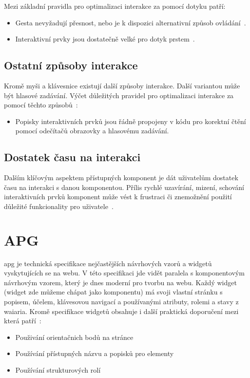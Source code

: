 Mezi základní pravidla pro optimalizaci interakce za pomocí dotyku patří:

\begin{itemize}
  \item Gesta nevyžadují přesnost, nebo je k dispozici alternativní způsob ovládání~\cite{wcag-pointer-gestures}.
  \item Interaktivní prvky jsou dostatečně velké pro dotyk prstem~\cite{wcag-target-size}.
\end{itemize}

\subsection{Ostatní způsoby interakce}


Kromě myši a klávesnice existují další způsoby interakce.
Další variantou může být hlasové zadávání.
Výčet důležitých pravidel pro optimalizaci interakce za pomocí těchto způsobů~\cite{w3-accessibility-principles}:

\begin{itemize}
  \item Popisky interaktivních prvků jsou řádně propojeny v kódu pro korektní čtění pomocí odečítačů obrazovky a hlasovému zadávání.
\end{itemize}

\subsection{Dostatek času na interakci}

Dalším klíčovým aspektem přístupných komponent je dát uživatelům dostatek času na interakci s danou komponentou.
Přílis rychlé uzavírání, mizení, schování interaktivních prvků komponent může vést k frustraci či znemožnění použití důležité funkcionality pro uživatele~\cite{w3-accessibility-principles}.

\section{APG}

\gls{apg} je technická specifikace nejčastějších návrhových vzorů a widgetů vyskytujících se na webu.
V této specifikaci jde vidět paralela s komponentovým návrhovým vzorem, který je dnes moderní pro tvorbu na webu.
Každý widget (widget zde můžeme chápat jako komponentu) má svoji vlastní stránku s popisem, účelem, klávesovou navigací a používanými atributy, rolemi a stavy z \gls{waiaria}.
Kromě specifikace widgetů obsahuje i další praktická doporučení mezi která patří~\cite{apg}:

\begin{itemize}
  \item Použivání orientačnich bodů na stránce
  \item Používání přístupných názvu a popisků pro elementy
  \item Používání strukturových rolí
\end{itemize}

